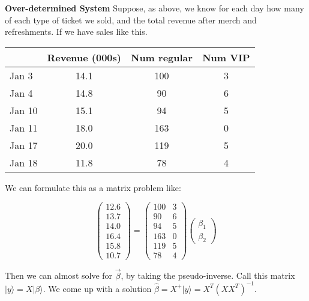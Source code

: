 \documentclass{amsbook}
\begin{document}
\begin{tcolorbox}[title=Example,colback=blue!5]
  {\bfseries\Large Over-determined System}\label{OverDeterminedSystem}
Suppose, as above, we know for each day how many of each type of ticket we sold, and the total revenue after merch and refreshments.  If we have sales like this. 

  \begin{tabular}{|l|c|c|c|}
  \hline
         & \multicolumn{1}{l|}{Revenue (000s)} & \multicolumn{1}{l|}{Num regular} & \multicolumn{1}{l|}{Num VIP} \\ \hline
  Jan 3  & 14.1                                & 100                              & 3                            \\ \hline
  Jan 4  & 14.8                                & 90                               & 6                            \\ \hline
  Jan 10 & 15.1                                & 94                               & 5                            \\ \hline
  Jan 11 & 18.0                                & 163                              & 0                            \\ \hline
  Jan 17 & 20.0                                & 119                              & 5                            \\ \hline
  Jan 18 & 11.8                                & 78                               & 4                            \\ \hline
  \end{tabular}

We can formulate this as a matrix problem like:

$$
\left(\begin{array}{c} 12.6\\13.7\\14.0\\16.4\\15.8\\10.7 \end{array}\right)=\left(\begin{array}{cc}100&3\\90&6\\94&5\\163&0\\119&5\\78&4 \end{array}\right)\left(\begin{array}{c}\beta_1 \\ \beta_2\end{array}\right)
$$

Then we can almost solve for $\vec\beta$, by taking the pseudo-inverse.  Call this matrix $|y\rangle=X|\beta\rangle$.  We come up with a solution $\hat\beta=X^+|y\rangle=X^T\left(XX^T\right)^{-1}$.
\end{tcolorbox}
\end{document}
